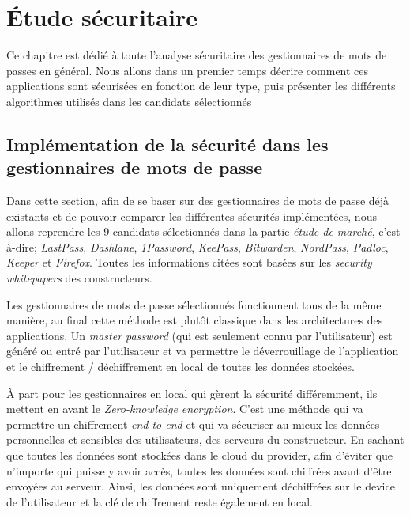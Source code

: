 
\chapter{Étude sécuritaire}
\label{ch:etude_secu}

Ce chapitre est dédié à toute l'analyse sécuritaire des gestionnaires de mots de passes en général. Nous allons dans un premier temps décrire comment ces applications sont sécurisées en fonction de leur type, puis présenter les différents algorithmes utilisés dans les candidats sélectionnés

\section{Implémentation de la sécurité dans les gestionnaires de mots de passe}

Dans cette section, afin de se baser sur des gestionnaires de mots de passe déjà existants et de pouvoir comparer les différentes sécurités implémentées, nous allons reprendre les 9 candidats sélectionnés dans la partie \hyperref[ch:etude_marche]{\textit{étude de marché}}, c'est-à-dire; \textit{LastPass}, \textit{Dashlane}, \textit{1Password}, \textit{KeePass}, \textit{Bitwarden}, \textit{NordPass}, \textit{Padloc}, \textit{Keeper} et \textit{Firefox}. Toutes les informations citées sont basées sur les \textit{security whitepapers} des constructeurs\cite{lastpasssecurity}\cite{dashlanesecurity}\cite{1passwordsecurity}\cite{keepasssecurity}\cite{bitwardensecurity}\cite{padlocsecurity}\cite{keepersecurity}\cite{nordpasssecurity}.

Les gestionnaires de mots de passe sélectionnés fonctionnent tous de la même manière, au final cette méthode est plutôt classique dans les architectures des applications. Un \textit{master password} (qui est seulement connu par l'utilisateur) est généré ou entré par l'utilisateur et va permettre le déverrouillage de l'application et le chiffrement / déchiffrement en local de toutes les données stockées. 

À part pour les gestionnaires en local qui gèrent la sécurité différemment, ils mettent en avant le \textit{Zero-knowledge encryption}. C'est une méthode qui va permettre un chiffrement \textit{end-to-end} et qui va sécuriser au mieux les données personnelles et sensibles des utilisateurs, des serveurs du constructeur. En sachant que toutes les données sont stockées dans le cloud du provider, afin d'éviter que n'importe qui puisse y avoir accès, toutes les données sont chiffrées avant d'être envoyées au serveur. Ainsi, les données sont uniquement déchiffrées sur le device de l'utilisateur et la clé de chiffrement reste également en local.

